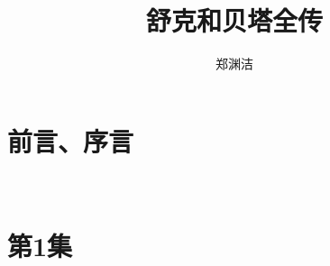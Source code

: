 \documentclass[a4paper,12pt,UTF8,twoside]{ctexbook}
\title{\heiti\zihao{0} 舒克和贝塔全传}
\author{郑渊洁}
\date{}
\begin{document}
	
\maketitle
\tableofcontents
	
\frontmatter
\chapter{前言、序言}
	
\mainmatter
	
	~\\
	
	\qquad  
	
\chapter{第1集}
\end{document}
